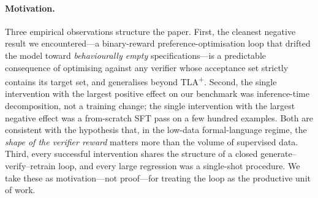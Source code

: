 \documentclass[11pt]{article}
\begin{document}
\paragraph{Motivation.}  Three empirical observations structure the
paper.  First, the cleanest negative result we encountered---a
binary-reward preference-optimisation loop that drifted the model
toward \emph{behaviourally empty} specifications---is a predictable
consequence of optimising against any verifier whose acceptance set
strictly contains its target set, and generalises beyond
TLA\textsuperscript{+}.  Second, the single intervention with the
largest positive effect on our benchmark was inference-time
decomposition, not a training change; the single intervention with
the largest negative effect was a from-scratch SFT pass on a few
hundred examples.  Both are consistent with the hypothesis that, in
the low-data formal-language regime, the \emph{shape of the verifier
reward} matters more than the volume of supervised data.  Third,
every successful intervention shares the structure of a closed
generate--verify--retrain loop, and every large regression was a
single-shot procedure.  We take these as motivation---not proof---for
treating the loop as the productive unit of work.
\end{document}
